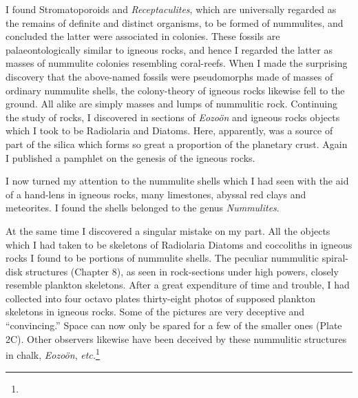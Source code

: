 \documentclass[a4paper, 12pt, oneside]{article}
\begin{document}
I found Stromatoporoids and \emph{Receptaculites}, which are universally regarded as the remains of definite and distinct organisms, to be formed of nummulites, and concluded the latter were associated in colonies. These fossils are palaeontologically similar to igneous rocks, and hence I regarded the latter as masses of nummulite colonies resembling coral-reefs. When I made the surprising discovery that the above-named fossils were pseudomorphs made of masses of ordinary nummulite shells, the colony-theory of igneous rocks likewise fell to the ground. All alike are simply masses and lumps of nummulitic rock. Continuing the study of rocks, I discovered in sections of \emph{Eozoön} and igneous rocks objects which I took to be Radiolaria and Diatoms. Here, apparently, was a source of part of the silica which forms so great a proportion of the planetary crust. Again I published a pamphlet on the genesis of the igneous rocks.

I now turned my attention to the nummulite shells which I had seen with the aid of a hand-lens in igneous rocks, many limestones, abyssal red clays and meteorites. I found the shells belonged to the genus \emph{Nummulites}.

At the same time I discovered a singular mistake on my part. All the objects which I had taken to be skeletons of Radiolaria Diatoms and coccoliths in igneous rocks I found to be portions of nummulite shells. The peculiar nummulitic spiral-disk structures (Chapter 8), as seen in rock-sections under high powers, closely resemble plankton skeletons. After a great expenditure of time and trouble, I had collected into four octavo plates thirty-eight photos of supposed plankton skeletons in igneous rocks. Some of the pictures are very deceptive and ``convincing.'' Space can now only be spared for a few of the smaller ones (Plate 2C). Other observers likewise have been deceived by these nummulitic structures in chalk, \emph{Eozoön}, \emph{etc.}\footnote{}
\end{document}

